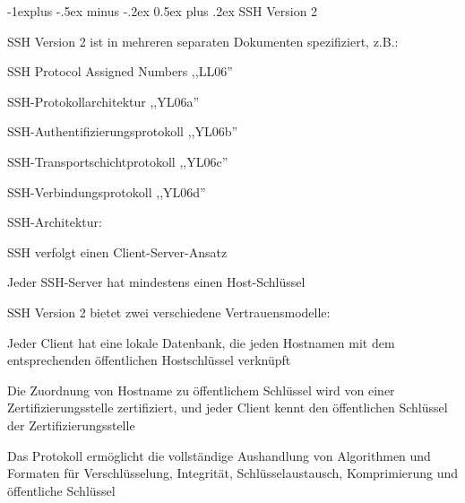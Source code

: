 \documentclass[a4paper]{article}
\makeatletter
\renewcommand{\subsection}{\@startsection{subsection}{2}{0mm}%
 {-1explus -.5ex minus -.2ex}%
 {0.5ex plus .2ex}%
 {\normalfont\normalsize\bfseries}}
\makeatother
\begin{document}
\begin{multicols}{3}
      \subsection{SSH Version 2}
      \begin{itemize*}
            \item SSH Version 2 ist in mehreren separaten Dokumenten spezifiziert, z.B.:
            \begin{itemize*}
                  \item SSH Protocol Assigned Numbers ,,LL06''
                  \item SSH-Protokollarchitektur ,,YL06a''
                  \item SSH-Authentifizierungsprotokoll ,,YL06b''
                  \item SSH-Transportschichtprotokoll ,,YL06c''
                  \item SSH-Verbindungsprotokoll ,,YL06d''
            \end{itemize*}
            \item SSH-Architektur:
            \begin{itemize*}
                  \item SSH verfolgt einen Client-Server-Ansatz
                  \item Jeder SSH-Server hat mindestens einen Host-Schlüssel
                  \item SSH Version 2 bietet zwei verschiedene Vertrauensmodelle:
                  \begin{itemize*}
                        \item Jeder Client hat eine lokale Datenbank, die jeden Hostnamen mit dem entsprechenden öffentlichen Hostschlüssel verknüpft
                        \item Die Zuordnung von Hostname zu öffentlichem Schlüssel wird von einer Zertifizierungsstelle zertifiziert, und jeder Client kennt den öffentlichen Schlüssel der Zertifizierungsstelle
                  \end{itemize*}
                  \item Das Protokoll ermöglicht die vollständige Aushandlung von Algorithmen und Formaten für Verschlüsselung, Integrität, Schlüsselaustausch, Komprimierung und öffentliche Schlüssel
            \end{itemize*}
      \end{itemize*}


\end{multicols}
\end{document}
